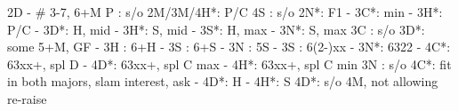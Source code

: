 2D - # 3-7, 6+M
P  : s/o
2M/3M/4H*: P/C
4S : s/o
2N*: F1
   - 3C*: min
        - 3H*: P/C 
   - 3D*: H, mid
   - 3H*: S, mid
   - 3S*: H, max
   - 3N*: S, max
3C : s/o
3D*: some 5+M, GF
   - 3H : 6+H
        - 3S : 6+S
        - 3N : 5S
   - 3S : 6(2-)xx
   - 3N*: 6322
   - 4C*: 63xx+, spl D
   - 4D*: 63xx+, spl C max
   - 4H*: 63xx+, spl C min
3N : s/o
4C*: fit in both majors, slam interest, ask
   - 4D*: H
   - 4H*: S
4D*: s/o 4M, not allowing re-raise

